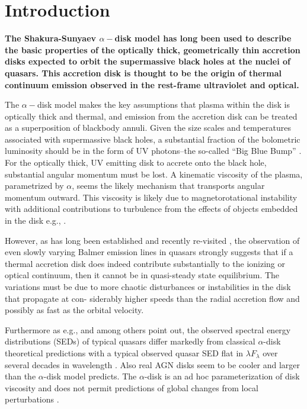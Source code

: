 \documentclass[a4paper,fleqn,usenatbib]{mnras}
\begin{document}
\section{Introduction}
{\bf 
The Shakura-Sunyaev $\alpha-$disk model \citep{SS73} has long been used to describe the basic properties of the optically thick, geometrically thin accretion disks expected to orbit the supermassive black holes at the nuclei of quasars. This accretion disk is thought to be the origin of thermal continuum emission observed in the rest-frame ultraviolet and optical.  

The $\alpha-$disk model makes the key assumptions that plasma within the disk is optically thick and thermal, and emission from the accretion disk can be treated as a superposition of blackbody annuli. Given the size scales and temperatures associated with supermassive black holes, a substantial fraction of the bolometric luminosity should be in the form of UV photons--the so-called ``Big Blue Bump'' \citep{Shields1978, Malkan_Sargent1982}.
For the optically thick, UV emitting disk to accrete onto the black hole, substantial angular momentum must be lost.  A kinematic viscosity of the plasma, parametrized by $\alpha$, seems the likely mechanism that transports angular momentum outward.  This viscosity is likely due to magnetorotational instability \citep[MRI; ][]{Balbus_Hawley1991} with additional contributions to turbulence from the effects of objects embedded in the disk e.g., \cite{McKernan2014}. 

However, as has long been established \citep[e.g., ][]{Alloin1985} and recently re-visited \citep[e.g., ][]{LaMassa2015, Runnoe2016, MacLeod2016, Ruan2016, Rumbaugh2017, Yang2017, Lawrence2018}, the observation of even slowly varying Balmer emission lines in quasars strongly suggests that if a thermal accretion disk does indeed contribute substantially to the ionizing or optical continuum, then it cannot be in quasi-steady state equilibrium. The variations must be due to more chaotic disturbances or instabilities in the disk that propagate at con- siderably higher speeds than the radial accretion flow and possibly as fast as the orbital velocity.

Furthermore as e.g., \citet{Koratkar_Blaes1999} and \citet{Sirko_Goodman2003} among others point out, the observed spectral energy distributions (SEDs) of typical quasars differ markedly from classical $\alpha$-disk theoretical predictions \citep[][]{SS73, Pringle1981} with a typical observed quasar SED flat in $\lambda F_{\lambda}$ over several decades in wavelength \citep{Elvis1994, Richards2006b}. 
Also real AGN disks seem to be cooler \citep[e.g., ][]{Lawrence2012} and larger \citep[e.g.,][]{Pooley2007, Morgan2010, Morgan2012, Mosquera2011} than the $\alpha$-disk model predicts. The $\alpha$-disk is an ad hoc parameterization of disk viscosity and does not permit predictions of global changes from local perturbations \citep{King2012}. 

}
\end{document}
